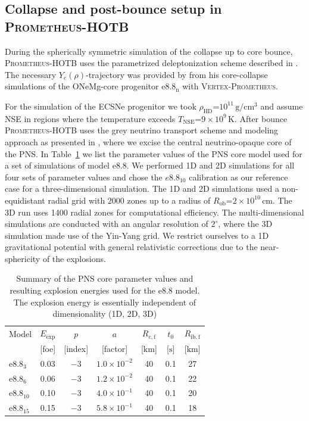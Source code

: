 \documentclass[fleqn,usenatbib]{mnras}
\newcommand{\km}{\ensuremath{\mathrm{km}}}
\newcommand{\s}{\ensuremath{\text{s}}}
\newcommand{\prom}{\textsc{Prometheus-HOTB}\xspace}
\newcommand{\vertexprom}{\textsc{Vertex-Prometheus}\xspace}
\newcommand{\onemg}{\ensuremath{\mathrm{e8.8}}\xspace}
\begin{document}
\subsection{Collapse and post-bounce setup in \prom}
\label{sec:Collapse and post-bounce setup in prom}
During the spherically symmetric simulation of the collapse up 
to core bounce, \prom uses the parametrized deleptonization scheme 
described in \citet{Liebendorfer2005}. The necessary 
$Y_{e}(\rho)$-trajectory was provided by \cite{Huedepohl2018} from 
his core-collapse simulations of the ONeMg-core progenitor 
$\mathrm{e8.8_{n}}$ with \vertexprom.

For the simulation of the ECSNe progenitor we took
$\rho_{\mathrm{HD}}\mathord{=}10^{11}\,\mathrm{g/cm^3}$ and 
assume NSE in regions where the 
temperature exceeds $T_{\mathrm{NSE}}\mathord{=}9\times10^9\,\mathrm{K}$.
After bounce \prom uses the grey neutrino transport scheme and
modeling approach as presented in \cite{Scheck2006}, where we 
excise the central neutrino-opaque core of the PNS.
In Table~\ref{table:e8param} we list the parameter values of the 
PNS core model used for a set of simulations of model \onemg. 
We performed 1D and 2D simulations for all four sets of parameter 
values and 
chose the $e8.8_{10}$ calibration as our reference case for a 
three-dimensional simulation. The 1D and 2D simulations used a 
non-equidistant 
radial grid with 2000 zones up to a radius of 
$R_{\mathrm{ob}}\mathord{=}2\times 10^{10}\,\text{cm}$. 
The 3D run uses 1400 radial zones for computational efficiency. 
The multi-dimensional simulations are conducted with an angular 
resolution of $2^{\circ}$, where the 3D simulation made use of
the Yin-Yang grid.
We restrict ourselves to a 1D gravitational potential with general 
relativistic corrections due to the near-sphericity of the explosions.

\begin{table}
\centering
\caption{Summary of the PNS core parameter values and resulting 
explosion energies used for the \onemg model. The explosion energy 
is essentially independent of dimensionality (1D, 2D, 3D)}
  \label{table:e8param}
   \begin{tabular}{l  c   c   c   c   c   c}
  \hline
  Model &
  $E_{\mathrm{exp}}$ &
  $p$ & 
  $a$ & 
  $R_{\mathrm{c,f}}$ &
  $t_0$ & 
  $R_{\mathrm{ib,f}}$ \\
                &
  [foe] &
  [index] &
  [factor] &
  [$\km$]  &
  [$\s$] &
  [$\km$] \\
  \hline
  $\mathrm{e}8.8_{3}$  & 0.03 & $-3$ & $1.0\times 10^{-2}$ & 40 & 0.1 &  27 \\
  $\mathrm{e}8.8_{6}$  & 0.06 & $-3$ & $1.2\times 10^{-2}$ & 40 & 0.1 &  22 \\
  $\mathrm{e}8.8_{10}$ & 0.10 & $-3$ & $4.0\times 10^{-1}$ & 40 & 0.1 &  20 \\
  $\mathrm{e}8.8_{15}$ & 0.15 & $-3$ & $5.8\times 10^{-1}$ & 40 & 0.1 &  18 \\
  \hline
  \end{tabular}
\end{table}
\end{document}
